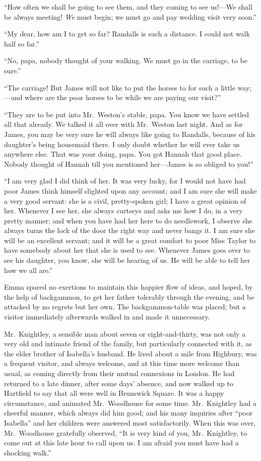 ``How often we shall be going to see them, and they coming to see
us!---We shall be always meeting! \emph{We} must begin; we must go and pay
wedding visit very soon.''

``My dear, how am I to get so far? Randalls is such a distance.
I could not walk half so far.''

``No, papa, nobody thought of your walking.  We must go in the carriage,
to be sure.''

``The carriage! But James will not like to put the horses to for
such a little way;---and where are the poor horses to be while we
are paying our visit?''

``They are to be put into Mr.\ Weston's stable, papa.  You know we
have settled all that already.  We talked it all over with Mr.\ Weston
last night.  And as for James, you may be very sure he will always like
going to Randalls, because of his daughter's being housemaid there.
I only doubt whether he will ever take us anywhere else.  That was
your doing, papa.  You got Hannah that good place.  Nobody thought
of Hannah till you mentioned her---James is so obliged to you!''

``I am very glad I did think of her.  It was very lucky, for I would
not have had poor James think himself slighted upon any account;
and I am sure she will make a very good servant: she is a civil,
pretty-spoken girl; I have a great opinion of her.  Whenever I see her,
she always curtseys and asks me how I do, in a very pretty manner;
and when you have had her here to do needlework, I observe she
always turns the lock of the door the right way and never bangs it.
I am sure she will be an excellent servant; and it will be a great
comfort to poor Miss Taylor to have somebody about her that she is
used to see.  Whenever James goes over to see his daughter, you know,
she will be hearing of us.  He will be able to tell her how we
all are.''

Emma spared no exertions to maintain this happier flow of ideas,
and hoped, by the help of backgammon, to get her father tolerably
through the evening, and be attacked by no regrets but her own.
The backgammon-table was placed; but a visitor immediately afterwards
walked in and made it unnecessary.

Mr.\ Knightley, a sensible man about seven or eight-and-thirty, was not
only a very old and intimate friend of the family, but particularly
connected with it, as the elder brother of Isabella's husband.
He lived about a mile from Highbury, was a frequent visitor,
and always welcome, and at this time more welcome than usual,
as coming directly from their mutual connexions in London.  He had
returned to a late dinner, after some days' absence, and now walked
up to Hartfield to say that all were well in Brunswick Square.
It was a happy circumstance, and animated Mr.\ Woodhouse for some time.
Mr.\ Knightley had a cheerful manner, which always did him good;
and his many inquiries after ``poor Isabella'' and her children were
answered most satisfactorily.  When this was over, Mr.\ Woodhouse
gratefully observed, ``It is very kind of you, Mr.\ Knightley, to come
out at this late hour to call upon us.  I am afraid you must have
had a shocking walk.''

